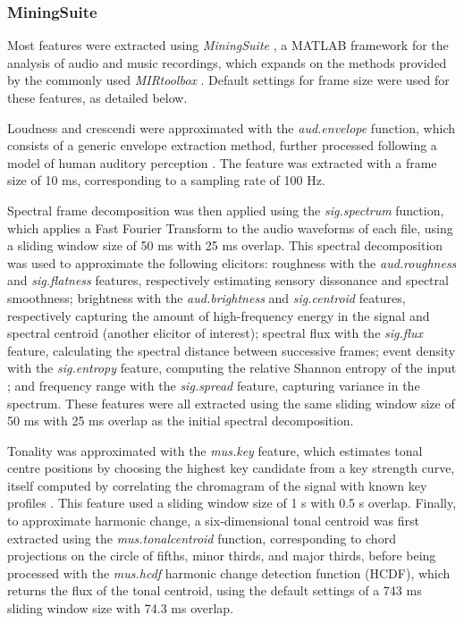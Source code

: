 \subsubsection{MiningSuite}

Most features were extracted using \emph{MiningSuite} \parencite{lartillot2019}, a MATLAB framework for the analysis of audio and music recordings, which expands on the methods provided by the commonly used \emph{MIRtoolbox} \parencite{lartillot2008}. Default settings for frame size were used for these features, as detailed below.

Loudness and crescendi were approximated with the \emph{aud.envelope} function, which consists of a generic envelope extraction method, further processed following a model of human auditory perception \parencite{klapuri2006}. The feature was extracted with a frame size of 10 ms, corresponding to a sampling rate of 100 Hz.

Spectral frame decomposition was then applied using the \emph{sig.spectrum} function, which applies a Fast Fourier Transform to the audio waveforms of each file, using a sliding window size of 50 ms with 25 ms overlap. This spectral decomposition was used to approximate the following elicitors: roughness with the \emph{aud.roughness} and \emph{sig.flatness} features, respectively estimating sensory dissonance and spectral smoothness; brightness with the \emph{aud.brightness} and \emph{sig.centroid} features, respectively capturing the amount of high-frequency energy in the signal and spectral centroid (another elicitor of interest); spectral flux with the \emph{sig.flux} feature, calculating the spectral distance between successive frames; event density with the \emph{sig.entropy} feature, computing the relative Shannon entropy of the input \parencite{shannon1948}; and frequency range with the \emph{sig.spread} feature, capturing variance in the spectrum. These features were all extracted using the same sliding window size of 50 ms with 25 ms overlap as the initial spectral decomposition.

Tonality was approximated with the \emph{mus.key} feature, which estimates tonal centre positions by choosing the highest key candidate from a key strength curve, itself computed by correlating the chromagram of the signal with known key profiles \parencite{gomez2006,krumhansl1990}. This feature used a sliding window size of 1 s with 0.5 s overlap. Finally, to approximate harmonic change, a six-dimensional tonal centroid was first extracted using the \emph{mus.tonalcentroid} function, corresponding to chord projections on the circle of fifths, minor thirds, and major thirds, before being processed with the \emph{mus.hcdf} harmonic change detection function (HCDF), which returns the flux of the tonal centroid, using the default settings of a 743 ms sliding window size with 74.3 ms overlap.

